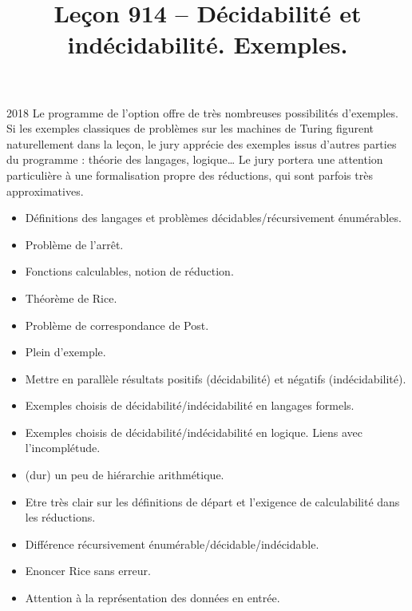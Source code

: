 \documentclass{agregfiche}
\title{Leçon 914 -- Décidabilité et indécidabilité. Exemples.}
\begin{document}
\maketitle

\secrapports

\begin{rapport}{2018}
Le programme de l'option offre de très nombreuses possibilités d'exemples. Si les exemples classiques de problèmes sur les machines de Turing figurent naturellement dans la leçon, le jury apprécie des exemples issus d'autres parties du programme : théorie des langages, logique\dots
Le jury portera une attention particulière à une formalisation propre des réductions, qui sont parfois très approximatives.
\end{rapport}

\secindispensables

\begin{itemize}
\item Définitions des langages et problèmes décidables/récursivement énumérables.
\item Problème de l'arrêt.
\item Fonctions calculables, notion de réduction.
\end{itemize}

\secasavoir

\begin{itemize}
    \item Théorème de Rice.
	\item Problème de correspondance de Post.
	\item Plein d'exemple.
\end{itemize}


\secidees
\begin{itemize}
\item Mettre en parallèle résultats positifs (décidabilité) et négatifs (indécidabilité).
\item Exemples choisis de décidabilité/indécidabilité en langages formels.
\item Exemples choisis de décidabilité/indécidabilité en logique. Liens avec l'incomplétude.
\item (dur) un peu de hiérarchie arithmétique.
\end{itemize}

\secpieges

\begin{itemize}
\item Etre très clair sur les définitions de départ et l'exigence de calculabilité dans les réductions.
\item Différence récursivement énumérable/décidable/indécidable.
\item Enoncer Rice sans erreur.
\item Attention à la représentation des données en entrée.
\end{itemize}
\end{document}
